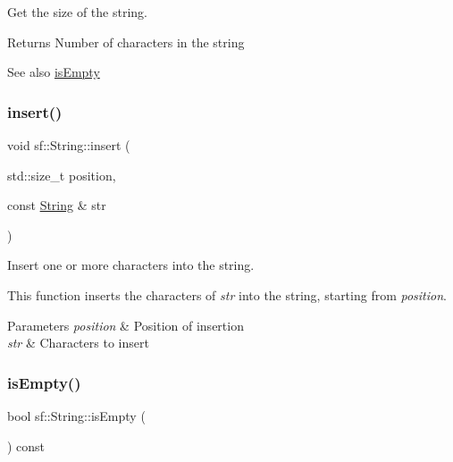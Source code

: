Get the size of the string. 

\begin{DoxyReturn}{Returns}
Number of characters in the string
\end{DoxyReturn}
\begin{DoxySeeAlso}{See also}
\hyperlink{classsf_1_1_string_a2ba26cb6945d2bbb210b822f222aa7f6}{is\+Empty} 
\end{DoxySeeAlso}
\mbox{\label{classsf_1_1_string_ad0b1455deabf07af13ee79812e05fa02}} 
\subsubsection{\texorpdfstring{insert()}{insert()}}
{\footnotesize\ttfamily void sf\+::\+String\+::insert (\begin{DoxyParamCaption}\item[{std\+::size\+\_\+t}]{position,  }\item[{const \hyperlink{classsf_1_1_string}{String} \&}]{str }\end{DoxyParamCaption})}



Insert one or more characters into the string. 

This function inserts the characters of {\itshape str} into the string, starting from {\itshape position}.


\begin{DoxyParams}{Parameters}
{\em position} & Position of insertion \\
\hline
{\em str} & Characters to insert \\
\hline
\end{DoxyParams}
\mbox{\label{classsf_1_1_string_a2ba26cb6945d2bbb210b822f222aa7f6}} 
\subsubsection{\texorpdfstring{is\+Empty()}{isEmpty()}}
{\footnotesize\ttfamily bool sf\+::\+String\+::is\+Empty (\begin{DoxyParamCaption}{ }\end{DoxyParamCaption}) const}



